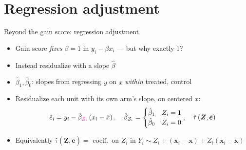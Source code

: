 \documentclass[table, xcolor = {dvipsnames}, 9pt]{beamer}
\theoremstyle{plain}
\newcommand{\mh}[1]{{\color{magenta}{#1}}}
\begin{document}
\section{Regression adjustment}

\begin{frame}[t]{Beyond the gain score: regression adjustment}
\vfill
\begin{itemize} \vfill
\item Gain score \emph{fixes} $\beta = 1$ in $y_i - \beta x_i$ --- but why exactly $1$? \vfill
\item Instead residualize with a \mh{least-squares} slope $\hat{\beta}$ \vfill
\item $\hat{\beta}_1, \hat{\beta}_0$: slopes from regressing $y$ on $x$ \emph{within} treated, control \citep{lin2013} \vfill
\item Residualize each unit with its own arm's slope, on centered $x$: \vfill
\begin{equation*}
\tilde{e}_i = y_i - \hat{\beta}_{\mh{Z_i}}\left(x_i - \bar{x}\right), \quad \hat{\beta}_{Z_i} = \begin{cases} \hat{\beta}_1 & Z_i = 1 \\ \hat{\beta}_0 & Z_i = 0 \end{cases}, \quad \hat{\tau}\left(\bm{Z}, \tilde{\bm{e}}\right)
\end{equation*} \vfill
\item Equivalently $\hat{\tau}\left(\bm{Z}, \tilde{\bm{e}}\right) = $ coeff.\ on $Z_i$ in $Y_i \sim Z_i + (\bm{x}_i - \bar{\bm{x}}) + Z_i(\bm{x}_i - \bar{\bm{x}})$  \vfill
\end{itemize} \vfill
\end{frame}
\end{document}
